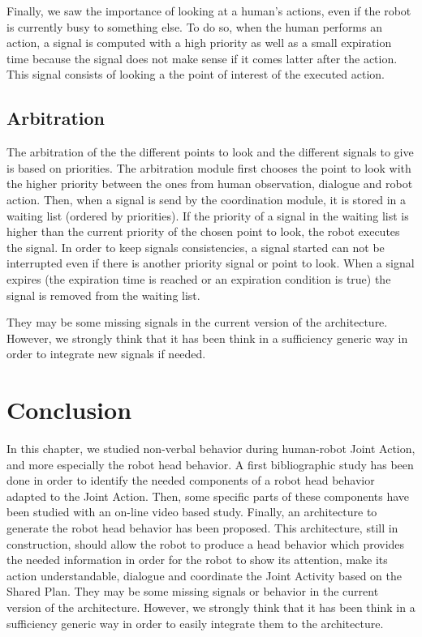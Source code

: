 \documentclass[english,a4paper,11pt,twoside]{StyleThese}
\begin{document}
Finally, we saw the importance of looking at a human's actions, even if the robot is currently busy to something else. To do so, when the human performs an action, a signal is computed with a high priority as well as a small expiration time because the signal does not make sense if it comes latter after the action. This signal consists of looking a the point of interest of the executed action. 

\subsection{Arbitration}

The arbitration of the the different points to look and the different signals to give is based on priorities. The arbitration module first chooses the point to look with the higher priority between the ones from human observation, dialogue and robot action. Then, when a signal is send by the coordination module, it is stored in a waiting list (ordered by priorities). If the priority of a signal in the waiting list is higher than the current priority of the chosen point to look, the robot executes the signal. In order to keep signals consistencies, a signal started can not be interrupted even if there is another priority signal or point to look. When a signal expires (the expiration time is reached or an expiration condition is true) the signal is removed from the waiting list.

They may be some missing signals in the current version of the architecture. However, we strongly think that it has been think in a sufficiency generic way in order to integrate new signals if needed.

\section{Conclusion}

In this chapter, we studied non-verbal behavior during human-robot Joint Action, and more especially the robot head behavior. A first bibliographic study has been done in order to identify the needed components of a robot head behavior adapted to the Joint Action. Then, some specific parts of these components have been studied with an on-line video based study. Finally, an architecture to generate the robot head behavior has been proposed. This architecture, still in construction, should allow the robot to produce a head behavior which provides the needed information in order for the robot to show its attention, make its action understandable, dialogue and coordinate the  Joint Activity based on the Shared Plan. They may be some missing signals or behavior in the current version of the architecture. However, we strongly think that it has been think in a sufficiency generic way in order to easily integrate them to the architecture. 

\ifdefined{}
\else


\end{document}
